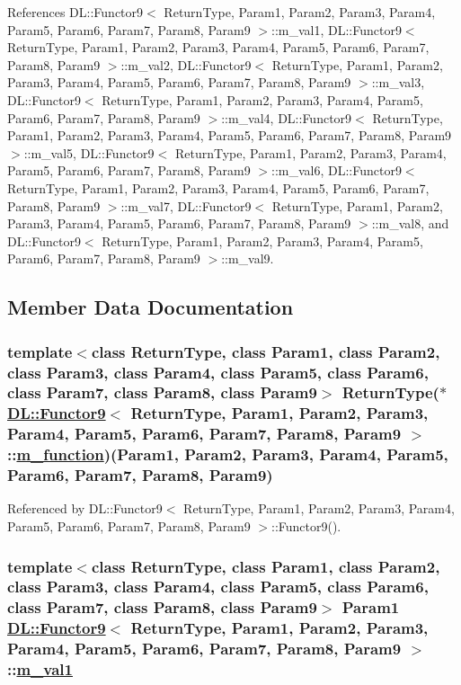 References DL::Functor9$<$ Return\-Type, Param1, Param2, Param3, Param4, Param5, Param6, Param7, Param8, Param9 $>$::m\_\-val1, DL::Functor9$<$ Return\-Type, Param1, Param2, Param3, Param4, Param5, Param6, Param7, Param8, Param9 $>$::m\_\-val2, DL::Functor9$<$ Return\-Type, Param1, Param2, Param3, Param4, Param5, Param6, Param7, Param8, Param9 $>$::m\_\-val3, DL::Functor9$<$ Return\-Type, Param1, Param2, Param3, Param4, Param5, Param6, Param7, Param8, Param9 $>$::m\_\-val4, DL::Functor9$<$ Return\-Type, Param1, Param2, Param3, Param4, Param5, Param6, Param7, Param8, Param9 $>$::m\_\-val5, DL::Functor9$<$ Return\-Type, Param1, Param2, Param3, Param4, Param5, Param6, Param7, Param8, Param9 $>$::m\_\-val6, DL::Functor9$<$ Return\-Type, Param1, Param2, Param3, Param4, Param5, Param6, Param7, Param8, Param9 $>$::m\_\-val7, DL::Functor9$<$ Return\-Type, Param1, Param2, Param3, Param4, Param5, Param6, Param7, Param8, Param9 $>$::m\_\-val8, and DL::Functor9$<$ Return\-Type, Param1, Param2, Param3, Param4, Param5, Param6, Param7, Param8, Param9 $>$::m\_\-val9.

\subsection{Member Data Documentation}
\hypertarget{classDL_1_1Functor9_r0}{
\subsubsection[m\_\-function]{\setlength{\rightskip}{0pt plus 5cm}template$<$class Return\-Type, class Param1, class Param2, class Param3, class Param4, class Param5, class Param6, class Param7, class Param8, class Param9$>$ Return\-Type($\ast$ \hyperlink{classDL_1_1Functor9}{DL::Functor9}$<$ Return\-Type, Param1, Param2, Param3, Param4, Param5, Param6, Param7, Param8, Param9 $>$::\hyperlink{classDL_1_1Functor9_r0}{m\_\-function})(Param1, Param2, Param3, Param4, Param5, Param6, Param7, Param8, Param9)}}
\label{classDL_1_1Functor9_r0}




Referenced by DL::Functor9$<$ Return\-Type, Param1, Param2, Param3, Param4, Param5, Param6, Param7, Param8, Param9 $>$::Functor9().\hypertarget{classDL_1_1Functor9_r1}{
\subsubsection[m\_\-val1]{\setlength{\rightskip}{0pt plus 5cm}template$<$class Return\-Type, class Param1, class Param2, class Param3, class Param4, class Param5, class Param6, class Param7, class Param8, class Param9$>$ Param1 \hyperlink{classDL_1_1Functor9}{DL::Functor9}$<$ Return\-Type, Param1, Param2, Param3, Param4, Param5, Param6, Param7, Param8, Param9 $>$::\hyperlink{classDL_1_1Functor9_r1}{m\_\-val1}}}
\label{classDL_1_1Functor9_r1}




